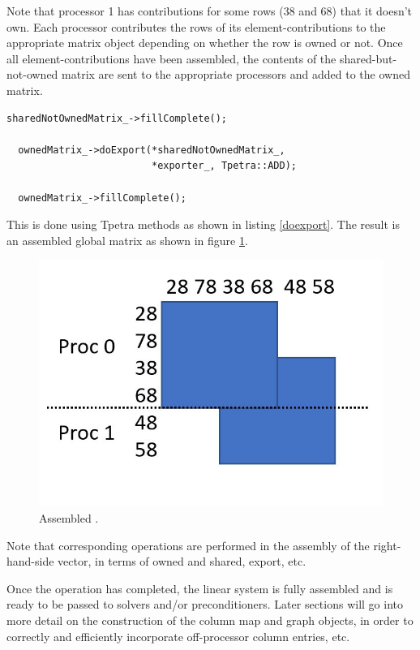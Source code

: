 Note that processor 1 has contributions for some rows (38 and 68) that it doesn't
own. Each processor contributes the rows of its element-contributions to
the appropriate matrix object depending on whether the row is owned or not.
Once all element-contributions have been assembled, the contents of the
shared-but-not-owned matrix are sent to the appropriate processors and added
to the owned matrix.
\begin{lstlisting}[caption={Assembly using export}, label=doexport]
  sharedNotOwnedMatrix_->fillComplete();

  ownedMatrix_->doExport(*sharedNotOwnedMatrix_,
                         *exporter_, Tpetra::ADD);

  ownedMatrix_->fillComplete();
\end{lstlisting}
This is done using Tpetra methods as shown in
listing \ref{doexport}. The result is an assembled global matrix as shown
in figure \ref{assembled}.

\begin{figure}[ht]
\centering
\includegraphics[scale=0.5]{figures/assembled.jpg}
\caption{Assembled .}
\label{assembled}
\end{figure}

Note that corresponding operations are performed in the assembly of the
right-hand-side vector, in terms of owned and shared, export, etc.

Once the  operation has completed, the linear system is
fully assembled and is ready to be passed to solvers and/or preconditioners.
Later sections will go into more detail on the construction of the
column map and graph objects, in order to correctly and efficiently
incorporate off-processor column entries, etc.

